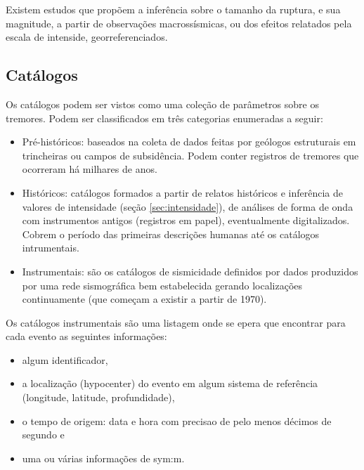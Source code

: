 Existem estudos \citep{bakun_1999} que propõem a inferência sobre o tamanho da ruptura, e sua
magnitude, a partir de observações macrossísmicas, ou dos efeitos relatados pela escala de intenside, georreferenciados.


\subsection{Catálogos}
\label{sec:catalogos}

Os catálogos podem ser vistos como uma coleção de parâmetros sobre os tremores. 
Podem ser classificados em três categorias \citep{woessner_catalog_2010} enumeradas a seguir:

\begin{itemize}\setlength{\itemsep}{0em}
	\item Pré-históricos: baseados na coleta de dados feitas por 
	geólogos estruturais em trincheiras ou campos de subsidência. Podem conter registros de tremores que ocorreram 
	há milhares de anos.
	\item Históricos: catálogos formados a partir de relatos históricos e inferência de valores de intensidade
	(seção \ref{sec:intensidade}), de análises de forma de onda com instrumentos antigos (registros em papel), eventualmente
	digitalizados.
	Cobrem o período das primeiras descrições humanas até os catálogos intrumentais.
	\item Instrumentais: são os catálogos de sismicidade definidos por dados produzidos por uma rede sismográfica bem estabelecida
	 gerando localizações continuamente (que começam a existir a partir de 1970).
\end{itemize} 

Os catálogos instrumentais são uma listagem onde se epera que encontrar para cada evento as seguintes informações:

\begin{itemize}\setlength{\itemsep}{0em}
	\item algum identificador,
	\item a localização (\gls{hypocenter}) do evento em algum sistema de referência (longitude, latitude, profundidade),
	\item o tempo de origem: data e hora com precisao de pelo menos décimos de segundo e
	\item uma ou várias informações de \glsdesc{sym:m}.
\end{itemize} 

